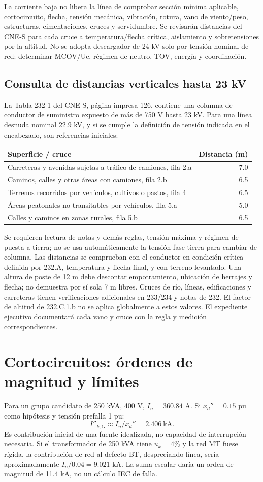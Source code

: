 La corriente baja no libera la línea de comprobar sección mínima aplicable, cortocircuito, flecha, tensión mecánica, vibración, rotura, vano de viento/peso, estructuras, cimentaciones, cruces y servidumbre. Se revisarán distancias del CNE-S para cada cruce a temperatura/flecha crítica, aislamiento y sobretensiones por la altitud. No se adopta descargador de 24 kV solo por tensión nominal de red: determinar MCOV/Uc, régimen de neutro, TOV, energía y coordinación.

\subsection{Consulta de distancias verticales hasta 23 kV}
La Tabla 232-1 del CNE-S, página impresa 126, contiene una columna de conductor de suministro expuesto de más de 750 V hasta 23 kV. Para una línea desnuda nominal 22.9 kV, y si se cumple la definición de tensión indicada en el encabezado, son referencias iniciales:
\begin{longtable}{L{10.7cm}r}
\toprule Superficie / cruce & Distancia (m)\\\midrule
Carreteras y avenidas sujetas a tráfico de camiones, fila 2.a & 7.0\\
Caminos, calles y otras áreas con camiones, fila 2.b & 6.5\\
Terrenos recorridos por vehículos, cultivos o pastos, fila 4 & 6.5\\
Áreas peatonales no transitables por vehículos, fila 5.a & 5.0\\
Calles y caminos en zonas rurales, fila 5.b & 6.5\\
\bottomrule
\end{longtable}
Se requieren lectura de notas y demás reglas, tensión máxima y régimen de puesta a tierra; no se usa automáticamente la tensión fase-tierra para cambiar de columna. Las distancias se comprueban con el conductor en condición crítica definida por 232.A, temperatura y flecha final, y con terreno levantado. Una altura de poste de 12 m debe descontar empotramiento, ubicación de herrajes y flecha; no demuestra por sí sola 7 m libres. Cruces de río, líneas, edificaciones y carreteras tienen verificaciones adicionales en 233/234 y notas de 232. El factor de altitud de 232.C.1.b no se aplica globalmente a estos valores. El expediente ejecutivo documentará cada vano y cruce con la regla y medición correspondientes.

\section{Cortocircuitos: órdenes de magnitud y límites}
Para un grupo candidato de 250 kVA, 400 V, $I_n=360.84$ A. Si $x_d''=0.15$ pu como hipótesis y tensión prefalla 1 pu:
\[
I''_{k,G}\approx I_n/x_d''=2.406\ \mathrm{kA}.
\]
Es contribución inicial de una fuente idealizada, no capacidad de interrupción necesaria. Si el transformador de 250 kVA tiene $u_k=4\%$ y la red MT fuese rígida, la contribución de red al defecto BT, despreciando línea, sería aproximadamente $I_n/0.04=9.021$ kA. La suma escalar daría un orden de magnitud de 11.4 kA, no un cálculo IEC de falla.

